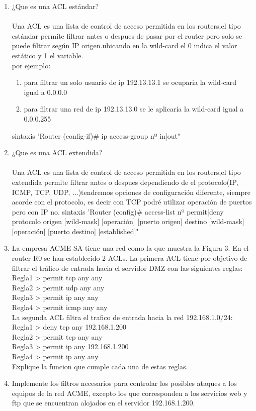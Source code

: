 \documentclass{udparticle}
\begin{document}
\begin{enumerate}
\item ¿Que es una ACL estándar?\\\\
Una ACL es una lista de control de acceso permitida en los routers,el tipo estándar permite filtrar antes o despues 
de pasar por el router pero solo se puede filtrar según IP origen.ubicando en la wild-card el 0 indica el valor estático 
y 1 el variable.\\
por ejemplo:
\begin{enumerate}
\item para filtrar un solo usuario de ip 192.13.13.1 se ocuparia la wild-card igual a 0.0.0.0
\item para filtrar una red de ip 192.13.13.0 se le aplicaría la wild-card igual a 0.0.0.255
\end{enumerate}
sintaxis 'Router (config-if)# ip access-group nº in|out"
\item ¿Que es una ACL extendida?\\\\
Una ACL es una lista de control de acceso permitida en los routers,el tipo extendida permite filtrar antes o despues
dependiendo de el protocolo(IP, ICMP, TCP, UDP, ...)tendremos opciones de configuración diferente, siempre acorde con 
el protocolo, es decir con TCP podré utilizar operación de puertos pero con IP no.
sintaxis 'Router (config)# access-list nº permit|deny protocolo origen [wild-mask] [operación] [puerto origen] destino [wild-mask] 
[operación] [puerto destino] [established]"
\item La empresa ACME SA tiene una red como la que muestra la Figura 3. 
En el router R0 se han establecido 2 ACLs. La primera ACL tiene por 
objetivo de filtrar el tráfico de entrada hacia el 
servidor DMZ con las siguientes reglas:\\
Regla1 > permit tcp any any\\
Regla2 > permit udp any any\\
Regla3 > permit ip any any\\
Regla4 > permit icmp any any\\
La segunda ACL filtra el trafico de entrada hacia la red 
192.168.1.0/24:\\
Regla1 > deny tcp any 192.168.1.200\\
Regla2 > permit tcp any any\\
Regla3 > permit ip any 192.168.1.200\\
Regla4 > permit ip any any\\
Explique la funcion que cumple cada una de estas reglas.\\
\item Implemente los filtros necesarios para controlar los posibles ataques a los equipos de la red ACME, excepto los que corresponden
a los servicios web y ftp que se encuentran alojados en el servidor 192.168.1.200.


\end{enumerate}
\end{document}
